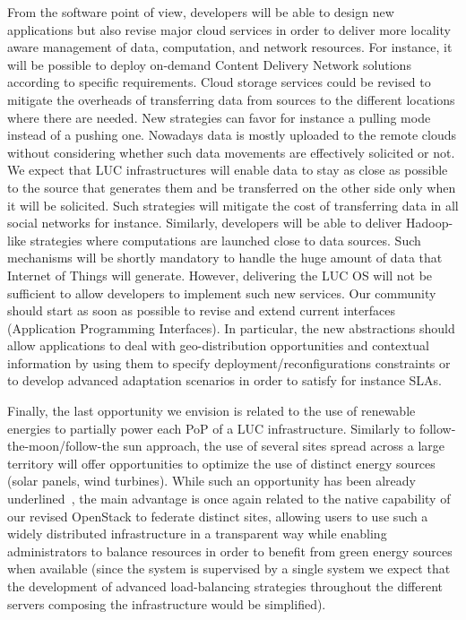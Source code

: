 From the software point of view, developers will be able to design new applications but also revise major cloud services in order to deliver more
locality aware management of data, computation, and network resources. For instance, it will be possible to deploy on-demand Content Delivery Network
solutions according to specific requirements. Cloud storage services could be revised to mitigate the overheads of transferring data from sources to
the different locations where there are needed. New strategies can favor for instance a pulling mode instead of a pushing one. Nowadays data is
mostly uploaded to the remote clouds without considering whether such data movements are effectively solicited or not. We expect that LUC
infrastructures will enable data to stay as close as possible to the source that generates them and be transferred on the other side only when it will
be solicited. Such strategies will mitigate the cost of transferring data in all social networks for instance. Similarly, developers will be able to
deliver Hadoop-like strategies where computations are launched close to data sources. Such mechanisms will be shortly mandatory to handle the huge
amount of data that Internet of Things will generate. However, delivering the LUC OS will not be sufficient to allow developers to implement such new
services. Our community should start as soon as possible to revise and extend current interfaces (\aka Application Programming Interfaces). In
particular, the new abstractions should allow applications to deal with geo-distribution opportunities and contextual information by using them to
specify deployment/reconfigurations constraints or to develop advanced adaptation scenarios in order to satisfy for instance SLAs.

Finally, the last opportunity we envision is related to the use of renewable energies to partially power each PoP of a LUC infrastructure. Similarly
to follow-the-moon/follow-the sun approach, the use of several sites spread across a large territory will offer opportunities to optimize the use of
distinct energy sources (solar panels, wind turbines). While such an opportunity has been already underlined~\cite{Berral:2014:BGC:2672596.2672694},
the main advantage is once again related to the native capability of our revised OpenStack to federate distinct sites, allowing users to use such a
widely distributed infrastructure in a transparent way while enabling administrators to balance resources in order to benefit from green energy
sources when available (since the system is supervised by a single system we expect that the development of advanced load-balancing strategies
throughout the different servers composing the infrastructure would be simplified).

